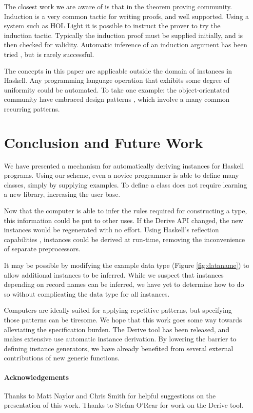 \documentclass{llncs}
\begin{document}
The closest work we are aware of is that in the theorem proving community. Induction is a very common tactic for writing proofs, and well supported. Using a system such as HOL Light \cite{hol_light} it is possible to instruct the prover to try the induction tactic. Typically the induction proof must be supplied initially, and is then checked for validity. Automatic inference of an induction argument has been tried \cite{mintchev:reasoning}, but is rarely successful.

The concepts in this paper are applicable outside the domain of instances in Haskell. Any programming language operation that exhibits some degree of uniformity could be automated. To take one example: the object-orientated community have embraced design patterns \cite{design_patterns}, which involve a many common recurring patterns.

\section{Conclusion and Future Work}
\label{sec:conclusion}

We have presented a mechanism for automatically deriving instances for Haskell programs. Using our scheme, even a novice programmer is able to define many classes, simply by supplying examples. To define a class does not require learning a new library, increasing the user base.

Now that the computer is able to infer the rules required for constructing a type, this information could be put to other uses. If the Derive API changed, the new instances would be regenerated with no effort. Using Haskell's reflection capabilities \cite{lammel:syb2}, instances could be derived at run-time, removing the inconvenience of separate preprocessors.

It may be possible by modifying the example data type (Figure \ref{fig:dataname}) to allow additional instances to be inferred. While we suspect that instances depending on record names can be inferred, we have yet to determine how to do so without complicating the data type for all instances.

Computers are ideally suited for applying repetitive patterns, but specifying those patterns can be tiresome. We hope that this work goes some way towards alleviating the specification burden. The Derive tool has been released, and makes extensive use automatic instance derivation. By lowering the barrier to defining instance generators, we have already benefited from several external contributions of new generic functions.

\paragraph{Acknowledgements}

Thanks to Matt Naylor and Chris Smith for helpful suggestions on the presentation of this work. Thanks to Stefan O'Rear for work on the Derive tool.



\end{document}
